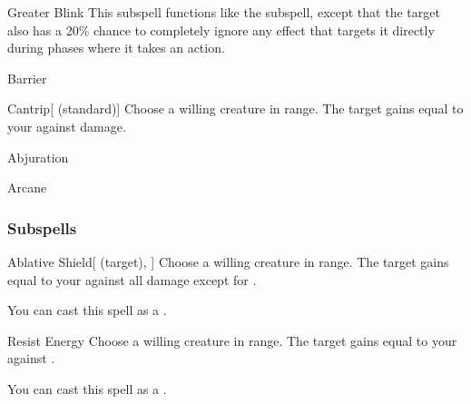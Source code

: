 \begin{ability}[\nth{7}]{Greater Blink}
This subspell functions like the  subspell, except that the target also has a 20\% chance to completely ignore any effect that targets it directly during phases where it takes an action.
\end{ability}
\vspace{0.25em}

\newpage
\begin{spellsection}{Barrier}

\begin{spellheader}
\end{spellheader}


\begin{ability}{Cantrip}[ (standard)]
Choose a willing creature in \rngclose range.
The target gains  equal to your  against  damage.
\end{ability}




 Abjuration

 Arcane
\end{spellsection}


\subsubsection{Subspells}


\begin{ability}[\nth{1}]{Ablative Shield}[ (target), ]
Choose a willing creature in \rngclose range.
The target gains  equal to your  against all damage except for .

You can cast this spell as a .
\end{ability}
\vspace{0.25em}


\begin{ability}[\nth{1}]{Resist Energy}
Choose a willing creature in \rngclose range.
The target gains  equal to your  against .

You can cast this spell as a .
\end{ability}
\vspace{0.25em}


